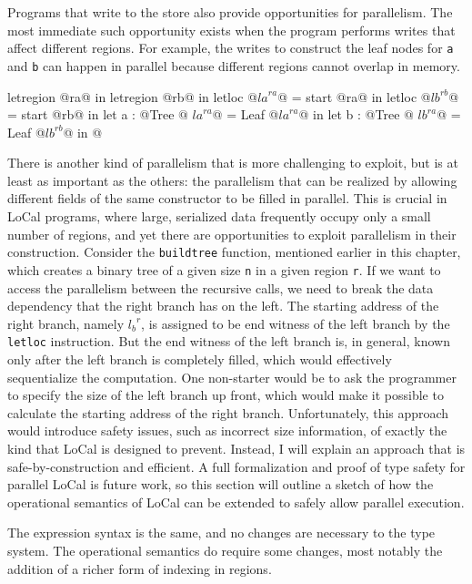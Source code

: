 \documentclass[showabstract,showacknowledgments,showpreface,showdedication,school]{iuphd}
\makeatletter
\theoremstyle{nonumberplain}
\newcommand{\sysname}[0]{LoCal\xspace}
\newcommand{\ourcalc}[0]{\sysname}
\newcommand{\locreg}[2]{\ensuremath{{#1}^{#2}}}
\newcommand{\tyatlocreg}[3]{#1 \ensuremath{@} \locreg{#2}{#3}}
\newcommand{\il}[1]{\lstinline[style=inline,mathescape=true];#1;}
\makeatother
\begin{document}
Programs that write to the store also provide opportunities for
parallelism.
The most immediate such opportunity exists when the program performs
writes that affect different regions.
For example, the writes to construct the leaf nodes for \il{a} and
\il{b} can happen in parallel because different regions cannot overlap
in memory.
\begin{code}
letregion @ra@ in
letregion @rb@ in
letloc @\locreg{la}{ra}@ = start @ra@ in
letloc @\locreg{lb}{rb}@ = start @rb@ in
let a : @\tyatlocreg{Tree}{la}{ra}@ = Leaf @\locreg{la}{ra}@ in
let b : @\tyatlocreg{Tree}{lb}{ra}@ = Leaf @\locreg{lb}{rb}@ in
@\ldots@
\end{code}
There is another kind of parallelism that is more challenging
to exploit, but is at least as important as the others:
the parallelism that can be realized by allowing different fields
of the same constructor to be filled in parallel.
This is crucial in \ourcalc{} programs, where large, serialized data
frequently occupy only a small number of regions, and yet there are
opportunities to exploit parallelism in their construction.
Consider the \il{buildtree} function, mentioned earlier in this chapter, which
creates a binary tree of a given size \il{n} in a given region \il{r}.
If we want to access the parallelism between the recursive calls,
we need to break the data dependency that the right branch has on
the left.
The starting address of the right branch, namely $\locreg{l_b}{r}$, is
assigned to be end witness of the left branch by the \il{letloc}
instruction.
But the end witness of the left branch is, in general, known only
after the left branch is completely filled, which would effectively
sequentialize the computation.
One non-starter would be to ask the programmer to specify the
size of the left branch up front, which would make it possible to
calculate the starting address of the right branch.
Unfortunately, this approach would introduce safety issues, such as
incorrect size information, of exactly the kind that \ourcalc{}
is designed to prevent.
Instead, I will explain an approach that is safe-by-construction and
efficient.
A full formalization and proof of type safety for parallel \ourcalc{}
is future work, so this section will outline a sketch of
how the operational semantics of \ourcalc{} can be extended
to safely allow parallel execution.



The expression syntax is the same, and no changes are necessary to the type system.
The operational semantics do require some changes, most notably the addition
of a richer form of indexing in regions.
\end{document}
